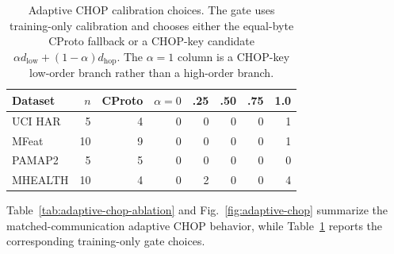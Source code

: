 \documentclass[preprint]{elsarticle}
\begin{document}
\begin{table}[t]
\centering
\caption{Adaptive CHOP ablation under matched communication. All method columns use the same per-client payload within each dataset. The table separates low-order coverage fusion, random high-order sketches, protocol-selected CHOP, and the train-calibrated mixture/fallback gate.}
\label{tab:adaptive-chop-ablation}
\end{table}

\begin{table}[t]
\centering
\caption{Adaptive CHOP calibration choices. The gate uses training-only calibration and chooses either the equal-byte CProto fallback or a CHOP-key candidate \(\alpha d_{\mathrm{low}}+(1-\alpha)d_{\mathrm{hop}}\). The \(\alpha=1\) column is a CHOP-key low-order branch rather than a high-order branch.}
\label{tab:adaptive-chop-gate}
\begin{tabular}{lrrrrrrr}
\toprule
Dataset & \(n\) & CProto & \(\alpha=0\) & .25 & .50 & .75 & 1.0 \\
\midrule
UCI HAR & 5 & 4 & 0 & 0 & 0 & 0 & 1 \\
MFeat & 10 & 9 & 0 & 0 & 0 & 0 & 1 \\
PAMAP2 & 5 & 5 & 0 & 0 & 0 & 0 & 0 \\
MHEALTH & 10 & 4 & 0 & 2 & 0 & 0 & 4 \\
\bottomrule
\end{tabular}
\end{table}


Table~\ref{tab:adaptive-chop-ablation} and Fig.~\ref{fig:adaptive-chop} summarize the matched-communication adaptive CHOP behavior, while Table~\ref{tab:adaptive-chop-gate} reports the corresponding training-only gate choices.
\end{document}
